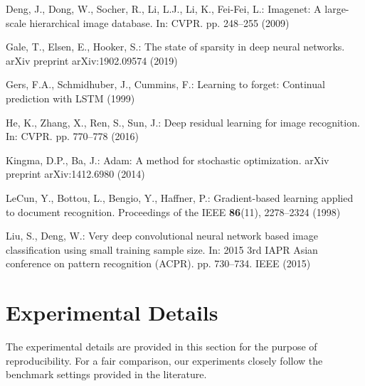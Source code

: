 \documentclass[runningheads, envcountsame, a4paper]{llncs}
\begin{document}
\begin{thebibliography}{10}
    Deng, J., Dong, W., Socher, R., Li, L.J., Li, K., Fei-Fei, L.: Imagenet: A
      large-scale hierarchical image database. In: CVPR. pp. 248--255 (2009)
    
    Gale, T., Elsen, E., Hooker, S.: The state of sparsity in deep neural networks.
      arXiv preprint arXiv:1902.09574  (2019)
    
    Gers, F.A., Schmidhuber, J., Cummins, F.: Learning to forget: Continual
      prediction with {LSTM}  (1999)
    
    He, K., Zhang, X., Ren, S., Sun, J.: Deep residual learning for image
      recognition. In: CVPR. pp. 770--778 (2016)
    
    Kingma, D.P., Ba, J.: Adam: A method for stochastic optimization. arXiv
      preprint arXiv:1412.6980  (2014)
    
    LeCun, Y., Bottou, L., Bengio, Y., Haffner, P.: Gradient-based learning applied
      to document recognition. Proceedings of the IEEE  \textbf{86}(11),
      2278--2324 (1998)
    
    Liu, S., Deng, W.: Very deep convolutional neural network based image
      classification using small training sample size. In: 2015 3rd IAPR Asian
      conference on pattern recognition (ACPR). pp. 730--734. IEEE (2015)
    

  \end{thebibliography}
  
\appendix

\section{Experimental Details} 
The experimental details are provided in this section for the purpose of reproducibility. For a fair comparison, our experiments closely follow the benchmark settings provided in the literature. 
\end{document}
